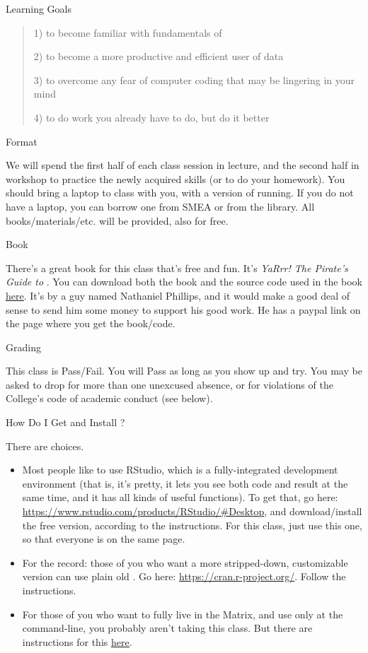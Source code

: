 \documentclass[11pt,letterpaper]{article}
\begin{document}
\vspace{1em}

{\Large Learning Goals}\hrulefill
\begin{quote} %

1) to become familiar with fundamentals of \R

2) to become a more productive and efficient user of data

3) to overcome any fear of computer coding that may be lingering in your mind

4) to do work you already have to do, but do it better
\end{quote}
{\Large Format}\hrulefill

We will spend the first half of each class session in lecture, and the second half in workshop to practice the newly acquired skills (or to do your homework).  You should bring a laptop to class with you, with a version of \R running. If you do not have a laptop, you can borrow one from SMEA or from the library.  All books/materials/etc. will be provided, also for free. 

{\Large Book}\hrulefill

There's a great book for this class that's free and fun.  It's \textit{YaRrr! The Pirate's Guide to \R}.  You can download both the book and the source code used in the book \href{https://ndphillips.github.io/piratesguide.html}{\underline{here}}.  It's by a guy named Nathaniel Phillips, and it would make a good deal of sense to send him some money to support his good work. He has a paypal link on the page where you get the book/code. 

{\Large Grading}\hrulefill

This class is Pass/Fail. You will Pass as long as you show up and try. You may be asked to drop for more than one unexcused absence, or for violations of the College's code of academic conduct (see below).


{\Large How Do I Get and Install \R?}\hrulefill

There are choices.
\begin{itemize}
	\item  Most people like to use \textsf{RStudio}, which is a fully-integrated development environment (that is, it's pretty, it lets you see both code and result at the same time, and it has all kinds of useful functions).  To get that, go here: \url{https://www.rstudio.com/products/RStudio/#Desktop}, and download/install the free version, according to the instructions. For this class, just use this one, so that everyone is on the same page. 
	\item For the record: those of you who want a more stripped-down, customizable version can use plain old \R. Go here: \url{https://cran.r-project.org/}. Follow the instructions. 
	\item For those of you who want to fully live in the Matrix,  and use \R only at the command-line, you probably aren't taking this class.  But there are instructions for this \href{https://cran.r-project.org/doc/manuals/r-patched/R-admin.html#Getting-and-unpacking-the-sources}{\underline{here}}.

\end{itemize}
\end{document}
